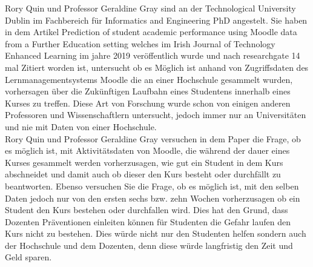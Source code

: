 Rory Quin und Professor Geraldine Gray sind an der \glqq Technological University Dublin\grqq{} im Fachbereich für \glqq Informatics and Engineering
PhD \grqq{} angestelt. Sie haben in dem Artikel \glqq Prediction of student academic performance using Moodle data from a Further Education setting\grqq{} welches im Irish Journal of Technology Enhanced Learning im jahre 2019 veröffentlich wurde und nach researchgate 14 mal Zitiert worden ist, untersucht ob es Möglich ist anhand von Zugriffsdaten des Lernmanagementsystems Moodle die an einer Hochschule gesammelt wurden,
vorhersagen über die Zukünftigen Laufbahn eines Studentens innerhalb eines Kurses zu treffen. Diese Art von Forschung wurde schon von einigen anderen Professoren und Wissenschaftlern untersucht, jedoch immer nur an Universitäten und nie mit Daten von einer Hochschule.
\\ \noindent
Rory Quin und Professor Geraldine Gray versuchen in dem Paper die Frage, ob es möglich ist, mit Aktivitätsdaten von Moodle, die während der dauer eines Kurses gesammelt werden vorherzusagen, wie gut ein Student in dem Kurs abschneidet und damit auch ob dieser den Kurs besteht oder durchfällt zu beantworten. 
Ebenso versuchen Sie die Frage, ob es möglich ist, mit den selben Daten jedoch nur von den ersten sechs bzw. zehn Wochen vorherzusagen ob ein Student den Kurs bestehen oder durchfallen wird.
Dies hat den Grund, dass Dozenten Präventionen einleiten können für Studenten die Gefahr laufen den Kurs nicht zu bestehen. Dies würde nicht nur den Studenten helfen sondern auch der Hochschule und dem Dozenten, denn diese würde langfristig den Zeit und Geld sparen.


